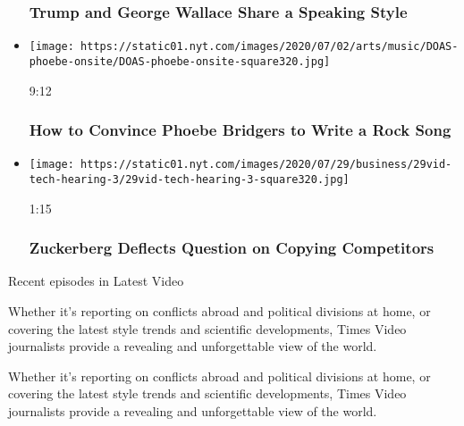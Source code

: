 \begin{itemize}
{  \subsubsection{Trump and George Wallace Share a Speaking
  Style}\label{trump-and-george-wallace-share-a-speaking-style}}
\item
  \href{https://www.nytimes.com/video/arts/music/100000007258359/phoebe-bridgers-kyoto.html?action=click\&module=video-series-bar\&region=header\&pgtype=Article\&playlistId=video/latest-video}{}

  \texttt{[image: https://static01.nyt.com/images/2020/07/02/arts/music/DOAS-phoebe-onsite/DOAS-phoebe-onsite-square320.jpg]}

  9:12

  \hypertarget{how-to-convince-phoebe-bridgers-to-write-a-rock-song}{%
  \subsubsection{How to Convince Phoebe Bridgers to Write a Rock
  Song}\label{how-to-convince-phoebe-bridgers-to-write-a-rock-song}}
\item
  \href{https://www.nytimes.com/video/us/politics/100000007263272/zuckerberg-jayapal-facebook.html?action=click\&module=video-series-bar\&region=header\&pgtype=Article\&playlistId=video/latest-video}{}

  \texttt{[image: https://static01.nyt.com/images/2020/07/29/business/29vid-tech-hearing-3/29vid-tech-hearing-3-square320.jpg]}

  1:15

  \hypertarget{zuckerberg-deflects-question-on-copying-competitors}{%
  \subsubsection{Zuckerberg Deflects Question on Copying
  Competitors}\label{zuckerberg-deflects-question-on-copying-competitors}}
\end{itemize}

Recent episodes in Latest Video

Whether it's reporting on conflicts abroad and political divisions at
home, or covering the latest style trends and scientific developments,
Times Video journalists provide a revealing and unforgettable view of
the world.

Whether it's reporting on conflicts abroad and political divisions at
home, or covering the latest style trends and scientific developments,
Times Video journalists provide a revealing and unforgettable view of
the world.

